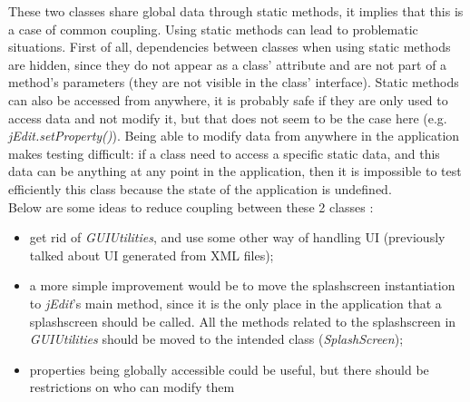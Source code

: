 These two classes share global data through static methods, it implies
that this is a case of common coupling. Using static methods can lead to
problematic situations. First of all, dependencies between classes when
using static methods are hidden, since they do not appear as a class' attribute
and are not part of a method's parameters (they are not visible in the
class' interface). Static methods can also be accessed from anywhere, it
is probably safe if they are only used to access data and not modify it,
but that does not seem to be the case here (e.g.
\emph{jEdit.setProperty()}). Being able to modify data from anywhere in
the application makes testing difficult: if a class need to access a
specific static data, and this data can be anything at any point in the
application, then it is impossible to test efficiently this class
because the state of the application is undefined. \cite{cite:jenkovDependencies}\\

Below are some ideas to reduce coupling between these 2 classes :

\begin{itemize}\itemsep1pt
    \item get rid of \emph{GUIUtilities}, and use some other way of handling UI
    (previously talked about UI generated from XML files);

    \item a more simple improvement would be to move the splashscreen
    instantiation to \emph{jEdit}'s main method, since it is the only place in
    the application that a splashscreen should be called.
    All the methods related to the splashscreen in \emph{GUIUtilities} should be
    moved to the intended class (\emph{SplashScreen});

    \item properties being globally accessible could be useful, but there should
    be restrictions on who can modify them
\end{itemize}

\newpage
